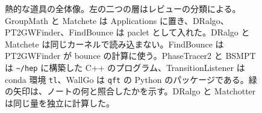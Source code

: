 \documentclass[a4paper,10pt]{ltjsarticle}
\begin{document}
\begin{figure}[hbp]
\caption{熱的な道具の全体像。左の二つの層はレビューの分類による。GroupMath と Matchete は Applications に置き、DRalgo、PT2GWFinder、FindBounce は paclet として入れた。DRalgo と Matchete は同じカーネルで読み込まない。FindBounce は PT2GWFinder が bounce の計算に使う。PhaseTracer2 と BSMPT は \texttt{\textasciitilde/hep} に構築した C++ のプログラム、TransitionListener は conda 環境 \texttt{tl}、WallGo は \texttt{qft} の Python のパッケージである。緑の矢印は、ノートの何と照合したかを示す。DRalgo と Matchotter は同じ量を独立に計算した。}
\label{fig:thermal}
\end{figure}
\end{document}
